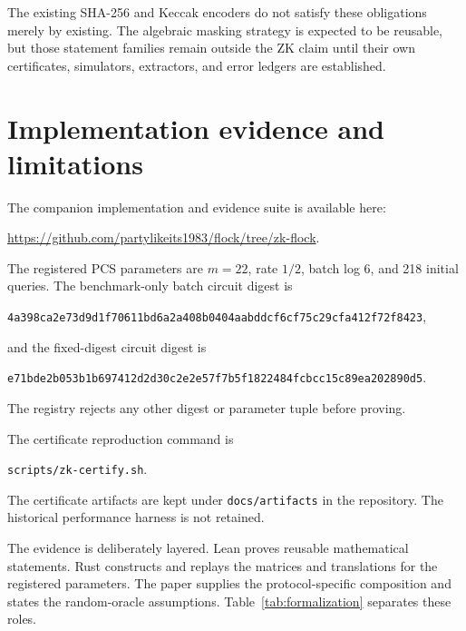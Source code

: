 \documentclass[11pt]{article}
\theoremstyle{definition}
\begin{document}
The existing SHA-256 and Keccak encoders do not satisfy these obligations merely
by existing.  The algebraic masking strategy is expected to be reusable, but
those statement families remain outside the ZK claim until their own
certificates, simulators, extractors, and error ledgers are established.

\section{Implementation evidence and limitations}\label{sec:evidence}

The companion implementation and evidence suite is available here:
\begin{center}
\small\url{https://github.com/partylikeits1983/flock/tree/zk-flock}.
\end{center}

The registered PCS parameters are $m=22$, rate $1/2$, batch log 6, and 218
initial queries.  The benchmark-only batch circuit digest is
\begin{center}
\small\texttt{4a398ca2e73d9d1f70611bd6a2a408b0404aabddcf6cf75c29cfa412f72f8423},
\end{center}
and the fixed-digest circuit digest is
\begin{center}
\small\texttt{e71bde2b053b1b697412d2d30c2e2e57f7b5f1822484fcbcc15c89ea202890d5}.
\end{center}
The registry rejects any other digest or parameter tuple before proving.

The certificate reproduction command is
\begin{center}
\small\texttt{scripts/zk-certify.sh}.
\end{center}
The certificate artifacts are kept under \texttt{docs/artifacts} in the
repository.  The historical performance harness is not retained.

The evidence is deliberately layered.  Lean proves reusable mathematical
statements.  Rust constructs and replays the matrices and translations for the
registered parameters.  The paper supplies the protocol-specific composition
and states the random-oracle assumptions.  Table~\ref{tab:formalization}
separates these roles.
\end{document}

